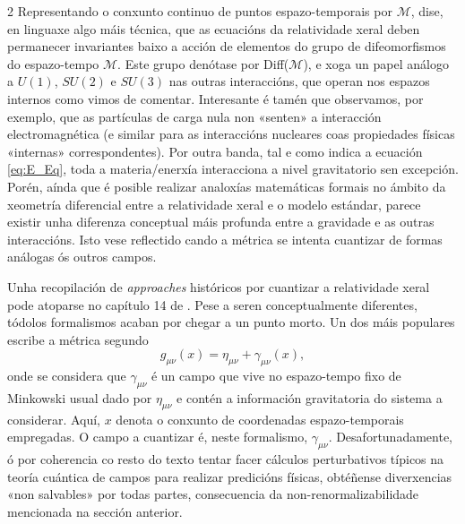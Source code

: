 \begin{multicols}{2}
Representando o conxunto continuo de puntos espazo-temporais por $\mathcal{M}$,
dise, en linguaxe algo máis técnica, que as ecuacións da relatividade xeral
deben permanecer invariantes baixo a acción de elementos do grupo de
difeomorfismos do espazo-tempo $\mathcal{M}$. Este grupo denótase por
Diff($\mathcal{M}$), e xoga un papel análogo a $U(1)$, $SU(2)$ e $SU(3)$ nas
outras interaccións, que operan nos espazos internos como vimos de comentar.
Interesante é tamén que observamos, por exemplo, que as partículas de carga
nula non «senten» a interacción electromagnética (e similar para as
interaccións nucleares coas propiedades físicas «internas» correspondentes).
Por outra banda, tal e como indica a ecuación \eqref{eq:E_Eq}, toda a
materia/enerxía interacciona a nivel gravitatorio sen excepción. Porén, aínda
que é posible realizar analoxías matemáticas formais no ámbito da xeometría
diferencial entre a relatividade xeral e o modelo estándar, parece existir unha
diferenza conceptual máis profunda entre a gravidade e as outras interaccións. %
Isto vese reflectido cando a métrica se intenta cuantizar de formas análogas ós
outros campos.

Unha recopilación de \textit{approaches} históricos por cuantizar a %
relatividade xeral pode atoparse no capítulo 14 de \cite{W1984}. Pese a seren
conceptualmente diferentes, tódolos formalismos acaban por chegar a un punto
morto. Un dos máis populares escribe a métrica segundo
%
\begin{equation}
    g_{\mu \nu}(x) = \eta_{\mu \nu} + \gamma_{\mu \nu}(x),
\end{equation}
%
onde se considera que $\gamma_{\mu \nu}$ é un campo que vive no espazo-tempo
fixo de Minkowski usual dado por $\eta_{\mu \nu}$ e contén a información
gravitatoria do sistema a considerar. Aquí, $x$ denota o conxunto de
coordenadas espazo-temporais empregadas. O campo a cuantizar é, neste
formalismo, $\gamma_{\mu \nu}$. Desafortunadamente, ó %
por coherencia co resto do texto tentar facer cálculos perturbativos típicos na
teoría cuántica de campos para realizar predicións físicas, obtéñense
diverxencias «non salvables» por todas partes, consecuencia da
non-renormalizabilidade mencionada na sección anterior.


\end{multicols}
